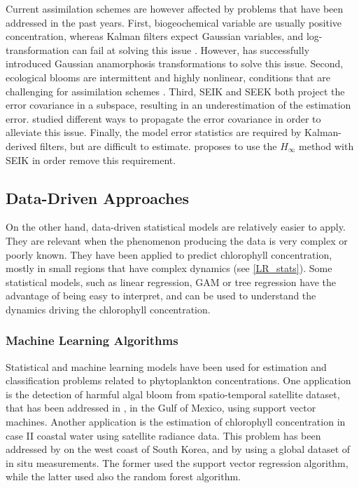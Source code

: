 Current assimilation schemes are however affected by problems that have been addressed in the past years. First, biogeochemical variable are usually positive concentration, whereas Kalman filters expect Gaussian variables, and log-transformation can fail at solving this issue \cite{Ciavatta2011}. However, \cite{Fontana2013} has successfully introduced Gaussian anamorphosis transformations to solve this issue. Second, ecological blooms are intermittent and highly nonlinear, conditions that are challenging for assimilation schemes \cite{Triantafyllou2012, Korres2012}. Third, SEIK and SEEK both project the error covariance in a subspace, resulting in an underestimation of the estimation error. \cite{Butenschon2012} studied different ways to propagate the error covariance in order to alleviate this issue. Finally, the model error statistics are required by Kalman-derived filters, but are difficult to estimate. \cite{Triantafyllou2012} proposes to use the $H_\infty$ method with SEIK in order remove this requirement.

\subsection{Data-Driven Approaches}

On the other hand, data-driven statistical models are relatively easier to apply. They are relevant when the phenomenon producing the data is very complex or poorly known. They have been applied to predict chlorophyll concentration, mostly in small regions that have complex dynamics (see \ref{LR_stats}). Some statistical models, such as linear regression, GAM or tree regression have the advantage of being easy to interpret, and can be used to understand the dynamics driving the chlorophyll concentration.

\subsubsection{Machine Learning Algorithms}

Statistical and machine learning models have been used for estimation and classification problems related to phytoplankton concentrations. One application is the detection of harmful algal bloom from spatio-temporal satellite dataset, that has been addressed in \cite{Gokaraju2011}, in the Gulf of Mexico, using support vector machines. Another application is the estimation of chlorophyll concentration in case II coastal water using satellite radiance data. This problem has been addressed by \cite{Kim2014} on the west coast of South Korea, and by \cite{Camps-Valls2006} using a global dataset of in situ measurements. The former used the support vector regression algorithm, while the latter used also the random forest algorithm.

